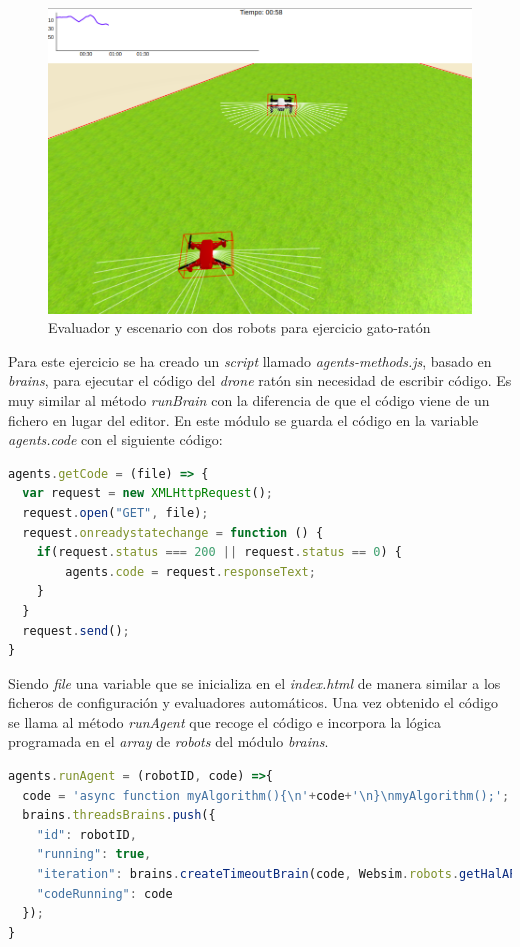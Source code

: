 \begin{figure}[ht]
\centering           
\includegraphics[scale=0.3]{img/evaluador_drone.png}
\caption{Evaluador y escenario con dos robots para ejercicio gato-ratón}
\label{fig:evaluador_gato_raton}
\end{figure}


Para este ejercicio se ha creado un \textit{script} llamado \textit{agents-methods.js}, basado en \textit{brains}, para ejecutar el código del \textit{drone} ratón sin necesidad de escribir código. Es muy similar al método \textit{runBrain} con la diferencia de que el código viene de un fichero en lugar del editor. En este módulo se guarda el código en la variable \textit{agents.code} con el siguiente código: 

\begin{lstlisting}[language=javascript]
agents.getCode = (file) => {
  var request = new XMLHttpRequest();
  request.open("GET", file);
  request.onreadystatechange = function () {
    if(request.status === 200 || request.status == 0) {
        agents.code = request.responseText;
    }
  }
  request.send();
}
\end{lstlisting}

Siendo \textit{file} una variable que se inicializa en el \textit{index.html} de manera similar a los ficheros de configuración y evaluadores automáticos. 
Una vez obtenido el código se llama al método \textit{runAgent} que recoge el código e incorpora la lógica programada en el \textit{array} de \textit{robots} del módulo \textit{brains}.

\begin{lstlisting}[language=javascript]
agents.runAgent = (robotID, code) =>{
  code = 'async function myAlgorithm(){\n'+code+'\n}\nmyAlgorithm();';
  brains.threadsBrains.push({
    "id": robotID,
    "running": true,
    "iteration": brains.createTimeoutBrain(code, Websim.robots.getHalAPI(robotID), robotID),
    "codeRunning": code
  });
}
\end{lstlisting}

